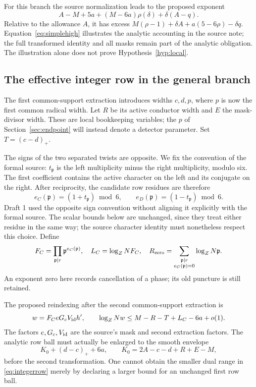 \documentclass[11pt]{article}
\theoremstyle{definition}
\begin{document}
For this branch the source normalization leads to the proposed exponent
\begin{equation}\label{eq:simplehigh}
 A-M+5a+(M-6a)\rho(\delta)+\delta(A-q).
\end{equation}
Relative to the allowance $A$, it has excess
$M(\rho-1)+\delta A+a(5-6\rho)-\delta q$.
Equation~\eqref{eq:simplehigh} illustrates the analytic accounting in the
source note; the full transformed identity and all masks remain part of
the analytic obligation. The illustration alone does not prove
Hypothesis~\ref{hyp:local}.

\subsection{The effective integer row in the general branch}
The first common-support extraction introduces widths $c,d,p$, where
$p$ is now the first common radical width. Let $R$ be its active
conductor width and $E$ the mask-divisor width. These are local
bookkeeping variables; the $p$ of Section~\ref{sec:endpoint} will instead
denote a detector parameter. Set $T=(c-d)_+$.

The signs of the two separated twists are opposite. We fix the convention
of the formal source: $t_{\mathfrak p}$ is the left multiplicity minus
the right multiplicity, modulo six. The first coefficient contains the
active character on the left and its conjugate on the right. After
reciprocity, the candidate row residues are therefore
\[
 e_C(\mathfrak p)=(1+t_{\mathfrak p})\bmod6,\qquad
 e_D(\mathfrak p)=(1-t_{\mathfrak p})\bmod6.
\]
Draft 1 used the opposite sign convention without aligning it explicitly
with the formal source. The scalar bounds below are unchanged, since
they treat either residue in the same way; the source character identity
must nonetheless respect this choice.
Define
\[
 F_C=\prod_{\mathfrak p\mid r}\mathfrak p^{e_C(\mathfrak p)},\quad
 L_C=\log_Z NF_C,\quad
 R_{\rm zero}=\sum_{\substack{\mathfrak p\mid r\\e_C(\mathfrak p)=0}}
                       \log_Z N\mathfrak p.
\]
An exponent zero here records cancellation of a phase; its old puncture
is still retained.

The proposed reindexing after the second common-support extraction is
\begin{equation}\label{eq:integerrow}
 w=F_CeG_cV_{\rm id}h',\qquad
 \log_Z Nw\le M-R-T+L_C-6a+o(1).
\end{equation}
The factors $e,G_c,V_{\rm id}$ are the source's mask and second
extraction factors. The analytic row ball must actually be enlarged to
the smooth envelope
\begin{equation}\label{eq:envelope}
 K_0+(d-c)_++6a,\qquad K_0=2A-c-d+R+E-M,
\end{equation}
before the second transformation. One cannot obtain the smaller dual
range in \eqref{eq:integerrow} merely by declaring a larger bound for an
unchanged first row ball.
\end{document}
